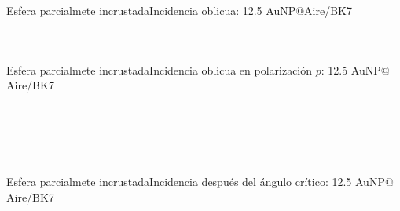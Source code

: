       \begin{frame}{Esfera parcialmete incrustada}{Incidencia oblicua: 12.5 AuNP$@$Aire/BK7}
      \vspace{-3.5em}\begin{columns}\scriptsize
      	\begin{table} \end{table}%
      	\begin{figure}\centering\fontsize{4}{5}\selectfont
          \def\svgwidth{.9\textwidth}
      \end{figure}
      \end{columns}
      \end{frame}

      \begin{frame}{Esfera parcialmete incrustada}{Incidencia oblicua en polarización $p$: 12.5 AuNP$@$Aire/BK7}\fontsize{4.5}{5.5}\selectfont
      \begin{columns}
      	\begin{figure} \centering
          \def\svgwidth{.85\textwidth}
          \\[1em]
          \def\svgwidth{.85\textwidth}
      \end{figure}
      	\begin{figure} \centering
          \def\svgwidth{.85\textwidth}
          \\[1em]
          \def\svgwidth{.85\textwidth}
      \end{figure}
      \end{columns}
      \end{frame}

      \begin{frame}{Esfera parcialmete incrustada}{Incidencia después del ángulo crítico: 12.5 AuNP$@$Aire/BK7}%
      \begin{columns}\fontsize{4}{5}\selectfont
      	\begin{figure} \centering
          \def\svgwidth{.85\textwidth}
          \\[1em]
          \def\svgwidth{.85\textwidth}
      \end{figure}
      	\begin{figure}\centering
        \def\svgwidth{.8\textwidth}\vspace*{-2em} \fontsize{4}{5}
      \end{figure}
      \end{columns}
      \end{frame}


